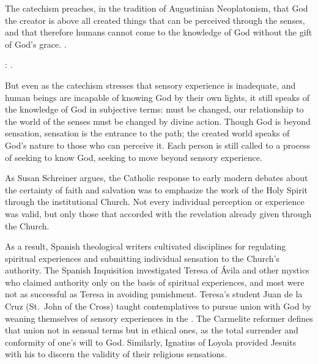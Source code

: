 The catechism preaches, in the tradition of Augustinian Neoplatonism, that God the creator is above all created things that can be perceived through the senses, and that therefore humans cannot come to the knowledge of God without the gift of God's grace.
.%
\begin{Footnote}
    \Autocite[18]{Catholic:Catechismus1614}: .
\end{Footnote}
But even as the catechism stresses that sensory experience is inadequate, and human beings are incapable of knowing God by their own lights, it still speaks of the knowledge of God in subjective terms:  must be changed, our relationship to the world of the senses must be changed by divine action.
Though God is beyond sensation, sensation is the entrance to the path; the created world speaks of God's nature to those who can perceive it.
Each person is still called to a process of seeking to know God, seeking to move beyond sensory experience.

As Susan Schreiner argues, the Catholic response to early modern debates about the certainty of faith and salvation was to emphasize the work of the Holy Spirit through the institutional Church.%
    \Autocite[\XXX]{Schreiner:Certainty}
Not every individual perception or experience was valid, but only those that accorded with the revelation already given through the Church.

As a result, Spanish theological writers cultivated disciplines for regulating spiritual experiences and submitting individual sensation to the Church's authority.
The Spanish Inquisition investigated Teresa of Ávila and other mystics who claimed authority only on the basis of spiritual experiences, and most were not as successful as Teresa in avoiding punishment.%
    \Autocites{Ahlgren:TeresaPolitics}{Francisca:Inquisition}
Teresa's student Juan de la Cruz (St.\ John of the Cross) taught contemplatives to pursue union with God by weaning themselves of sensory experiences in the .
The Carmelite reformer defines that union not in sensual terms but in ethical ones, as the total surrender and conformity of one's will to God.%
    \Autocite[bk.~I, ch.~5--7, 226--248]{JuandelaCruz:Subida}
Similarly, Ignatius of Loyola provided Jesuits with his  to discern the validity of their religious sensations.%
    \Autocite[ch.~6]{Schreiner:Certainty}

